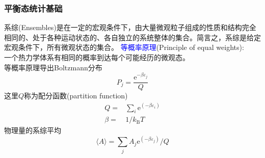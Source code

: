 \frame
{
	\frametitle{平衡态统计基础}
	系综(\textrm{Ensembles})是在一定的宏观条件下，由大量微观粒子组成的性质和结构完全相同的、处于各种运动状态的、各自独立的系统整体的集合。简言之，系综是给定宏观条件下，所有微观状态的集合。
	\vskip 3pt
	\textcolor{blue}{等概率原理}\textrm{(Principle of equal weights)}:\\
	一个热力学体系有相同的概率到达每个可能经历的微观态。\\
	等概率原理导出\textrm{Boltzmann}分布
	\begin{displaymath}
		P_j=\dfrac{\mathrm{e}^{-\beta\varepsilon_j}}Q
	\end{displaymath}
	这里$Q$称为配分函数\textrm{(partition function)}
	\begin{displaymath}
		\begin{aligned}
			Q=&\sum_i\mathrm{e}^{(-\beta\varepsilon_i)}\\
			\beta=&1/k_{\mathrm{B}}T
		\end{aligned}
	\end{displaymath}
	物理量的系综平均
	\begin{displaymath}
		\langle A\rangle=\sum_jA_j\mathrm{e}^{(-\beta\varepsilon_j)}/Q
	\end{displaymath}
}

